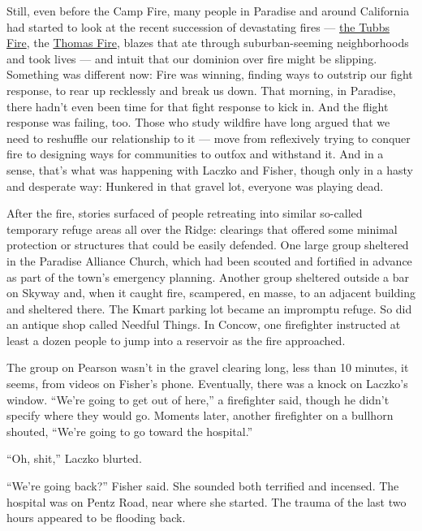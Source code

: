 Still, even before the Camp Fire, many people in Paradise and around
California had started to look at the recent succession of devastating
fires ---
\href{https://www.sfchronicle.com/bayarea/article/Wine-Country-fires-first-fatal-hours-12278092.php}{the
Tubbs Fire}, the
\href{https://www.latimes.com/local/lanow/la-me-ln-thomas-fire-edison-cause-20190313-story.html}{Thomas
Fire}, blazes that ate through suburban-seeming neighborhoods and took
lives --- and intuit that our dominion over fire might be slipping.
Something was different now: Fire was winning, finding ways to outstrip
our fight response, to rear up recklessly and break us down. That
morning, in Paradise, there hadn't even been time for that fight
response to kick in. And the flight response was failing, too. Those who
study wildfire have long argued that we need to reshuffle our
relationship to it --- move from reflexively trying to conquer fire to
designing ways for communities to outfox and withstand it. And in a
sense, that's what was happening with Laczko and Fisher, though only in
a hasty and desperate way: Hunkered in that gravel lot, everyone was
playing dead.

After the fire, stories surfaced of people retreating into similar
so-called temporary refuge areas all over the Ridge: clearings that
offered some minimal protection or structures that could be easily
defended. One large group sheltered in the Paradise Alliance Church,
which had been scouted and fortified in advance as part of the town's
emergency planning. Another group sheltered outside a bar on Skyway and,
when it caught fire, scampered, en masse, to an adjacent building and
sheltered there. The Kmart parking lot became an impromptu refuge. So
did an antique shop called Needful Things. In Concow, one firefighter
instructed at least a dozen people to jump into a reservoir as the fire
approached.

The group on Pearson wasn't in the gravel clearing long, less than 10
minutes, it seems, from videos on Fisher's phone. Eventually, there was
a knock on Laczko's window. ``We're going to get out of here,'' a
firefighter said, though he didn't specify where they would go. Moments
later, another firefighter on a bullhorn shouted, ``We're going to go
toward the hospital.''

``Oh, shit,'' Laczko blurted.

``We're going back?'' Fisher said. She sounded both terrified and
incensed. The hospital was on Pentz Road, near where she started. The
trauma of the last two hours appeared to be flooding back.

